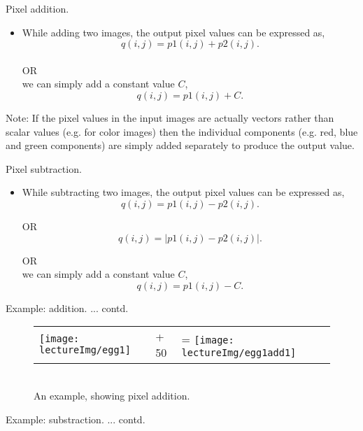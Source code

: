 \documentclass{response}
\begin{document}
{\large 

{\huge  Pixel addition.}
\begin{itemize}\setlength\itemsep{-0.5em}
\item While adding two images, the output pixel values can be expressed as, $$q(i,j) = p1(i,j) + p2(i,j).$$\\
OR\\

we can simply add a constant value $C$, $$q(i,j) = p1(i,j) + C.$$
\end{itemize}

\vfill
Note:
If the pixel values in the input images are actually vectors rather than scalar values (e.g. for color images) then the individual components (e.g. red, blue and green components) are simply added separately to produce the output value.



\newpage
\bigskip


{\huge Pixel subtraction.}

\begin{itemize}\setlength\itemsep{-0.5em}
\item While subtracting two images, the output pixel values can be expressed as, $$q(i,j) = p1(i,j) - p2(i,j).$$

OR\\
$$q(i,j) = |p1(i,j) - p2(i,j)|.$$

OR\\
we can simply add a constant value $C$, $$q(i,j) = p1(i,j) - C.$$
\end{itemize}



\newpage
\bigskip

{\huge Example: addition.} ... contd.
\bigskip


\begin{figure}[htp]
\centering
\begin{tabular}{llll}
\texttt{[image: lectureImg/egg1]} &
+ 50 &
=
\texttt{[image: lectureImg/egg1add1]} 
\end{tabular}
\mbox{}\\[20pt]
An example, showing pixel addition.
\end{figure}




\newpage
\bigskip

{\huge Example: substraction.} ... contd.
\bigskip


}
\end{document}
